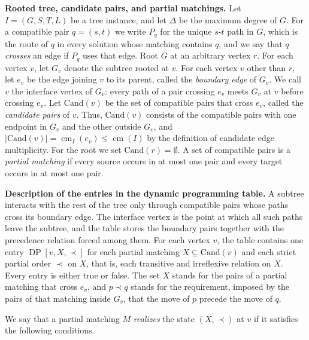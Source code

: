 \documentclass[a4paper,USenglish,thm-restate]{lipics-v2021}
\newcommand{\cm}{\operatorname{cm}}
\newcommand{\cand}{\mathrm{Cand}}
\theoremstyle{problemstyle}
\begin{document}
\smallskip
\noindent\textbf{Rooted tree, candidate pairs, and partial matchings.}
Let $I=(G,S,T,L)$ be a tree instance, and let $\Delta$ be the maximum degree of $G$. For a compatible pair $q=(s,t)$ we write $P_q$ for the unique $s$-$t$ path in $G$, which is the route of $q$ in every solution whose matching contains $q$, and we say that $q$ \emph{crosses} an edge if $P_q$ uses that edge. Root $G$ at an arbitrary vertex $r$. For each vertex $v$, let $G_v$ denote the subtree rooted at $v$. For each vertex $v$ other than $r$, let $e_v$ be the edge joining $v$ to its parent, called the \emph{boundary edge} of $G_v$. We call $v$ the interface vertex of $G_v$: every path of a pair crossing $e_v$ meets $G_v$ at $v$ before crossing $e_v$. Let $\cand(v)$ be the set of compatible pairs that cross $e_v$, called the \emph{candidate pairs} of $v$. Thus, $\cand(v)$ consists of the compatible pairs with one endpoint in $G_v$ and the other outside $G_v$, and $|\cand(v)|=\cm_I(e_v)\le\cm(I)$ by the definition of candidate edge multiplicity. For the root we set $\cand(r)=\emptyset$. A set of compatible pairs is a \emph{partial matching} if every source occurs in at most one pair and every target occurs in at most one pair.

\smallskip
\noindent\textbf{Description of the entries in the dynamic programming table.}
A subtree interacts with the rest of the tree only through compatible pairs
whose paths cross its boundary edge. The interface vertex is the point at
which all such paths leave the subtree, and the table stores the boundary
pairs together with the precedence relation forced among them. For each
vertex $v$, the table contains one entry $\operatorname{DP}[v,X,\prec]$ for each partial matching $X\subseteq\cand(v)$ and each strict partial order $\prec$ on $X$, that is, each transitive and irreflexive relation on $X$. Every entry is either true or false. The set $X$ stands for the pairs of a partial matching that cross $e_v$, and $p\prec q$ stands for the requirement, imposed by the pairs of that matching inside $G_v$, that the move of $p$ precede the move of $q$.
 
We say that a partial matching $M$ \emph{realizes} the state $(X,\prec)$ at $v$ if it satisfies the following conditions.
 
\end{document}
